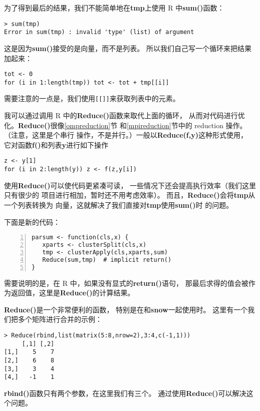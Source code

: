 为了得到最后的结果，我们不能简单地在{\bf tmp}上使用 R 中{\bf sum()}函数：

\begin{lstlisting}
> sum(tmp)
Error in sum(tmp) : invalid 'type' (list) of argument
\end{lstlisting}

这是因为{\bf sum()}接受的是向量，而不是列表。
所以我们自己写一个循环来把结果加起来：

\begin{lstlisting}
tot <- 0
for (i in 1:length(tmp)) tot <- tot + tmp[[i]]
\end{lstlisting}

需要注意的一点是，我们使用\texttt{[[]]}来获取列表中的元素。

我可以通过调用 R 中的{\bf Reduce()}函数来取代上面的循环，
从而对代码进行优化。{\bf Reduce()}很像\ref{ompreduction}节
和\ref{mpireduction}节中的 reduction 操作。（注意，这里是个串行
操作，不是并行。）一般以{\bf Reduce(f,y)}这种形式使用，
它对函数{\bf f()}和列表{\bf y}进行如下操作
\begin{lstlisting}
z <- y[1]
for (i in 2:length(y)) z <- f(z,y[i])
\end{lstlisting}

使用{\bf Reduce()}可以使代码更紧凑可读，
一些情况下还会提高执行效率（我们这里只有很少的
项目进行相加，暂时还不用考虑效率）。
而且，{\bf Reduce()}会将{\bf tmp}从一个列表转换为
向量，这就解决了我们直接对{\bf tmp}使用{\bf sum()}时
的问题。

下面是新的代码：

\begin{lstlisting}[numbers=left]
parsum <- function(cls,x) {
   xparts <- clusterSplit(cls,x)
   tmp <- clusterApply(cls,xparts,sum)
   Reduce(sum,tmp)  # implicit return()
}
\end{lstlisting}

需要说明的是，在 R 中，如果没有显式的{\bf return()}语句，
那最后求得的值会被作为返回值，这里是{\bf Reduce()}的计算结果。

{\bf Reduce()}是一个非常便利的函数，
特别是在和{\bf snow}一起使用时。
这里有一个我们把多个矩阵进行合并的示例：

\begin{lstlisting}
> Reduce(rbind,list(matrix(5:8,nrow=2),3:4,c(-1,1)))
     [,1] [,2]
[1,]    5    7
[2,]    6    8
[3,]    3    4
[4,]   -1    1
\end{lstlisting}

{\bf rbind()}函数只有两个参数，在这里我们有三个。
通过使用{\bf Reduce()}可以解决这个问题。

